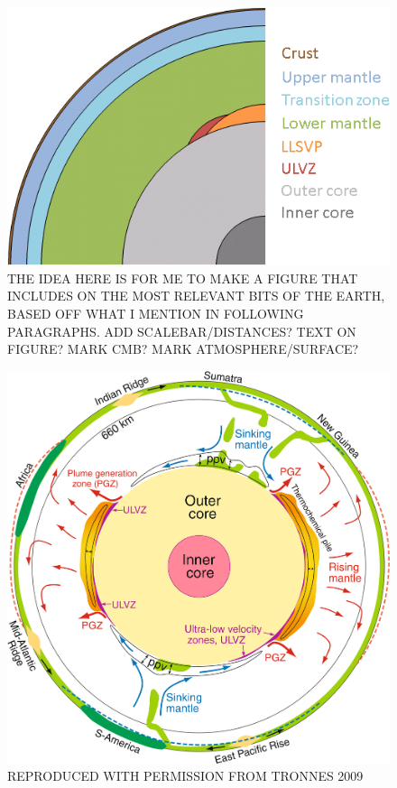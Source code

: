 \begin{figure}[h!]
  \includegraphics[width=\linewidth]{Figures/pp_earth_diagram2.png}
  \caption[EARTH STRUCTURE DIAGRAM]{THE IDEA HERE IS FOR ME TO MAKE A FIGURE THAT INCLUDES ON THE MOST RELEVANT BITS OF THE EARTH, BASED OFF WHAT I MENTION IN FOLLOWING PARAGRAPHS. ADD SCALEBAR/DISTANCES? TEXT ON FIGURE? MARK CMB? MARK ATMOSPHERE/SURFACE?}
  \label{fig:earth_diagram}
\end{figure}

\begin{figure}[h!]
  \includegraphics[width=\linewidth]{Figures/tronnes_earth_diagram.png}
  \caption[TRONNES EARTH STRUCTURE DIAGRAM]{REPRODUCED WITH PERMISSION FROM TRONNES 2009}
  \label{fig:tronnes_earth_diagram}
\end{figure}

